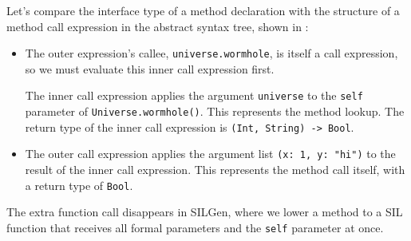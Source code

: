 \documentclass[../generics]{subfiles}
\begin{document}
\begin{figure}[b!]\label{method call expr}
\begin{center}
\end{center}
\end{figure}

Let's compare the interface type of a method declaration with the structure of a method call expression in the abstract syntax tree, shown in :
\begin{itemize}
\item The outer expression's callee, \texttt{universe.wormhole}, is itself a call expression, so we must evaluate this inner call expression first.

The inner call expression applies the argument \texttt{universe} to the \texttt{self} parameter of \texttt{Universe.wormhole()}. This represents the method lookup. The return type of the inner call expression is \verb|(Int, String) -> Bool|.
\item The outer call expression applies the argument list \verb|(x: 1, y: "hi")| to the result of the inner call expression. This represents the method call itself, with a return type of \texttt{Bool}.
\end{itemize}
The extra function call disappears in SILGen, where we lower a method to a SIL function that receives all formal parameters and the \texttt{self} parameter at once.
\end{document}
